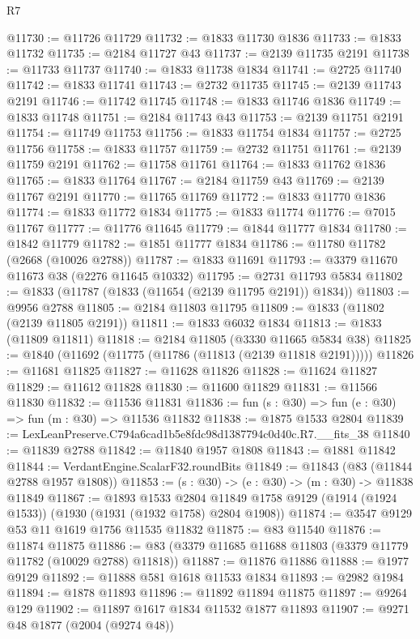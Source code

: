 \begin{lexlean}{R7}
\begin{coremodule}
@11730 := @11726 @11729
@11732 := @1833 @11730 @1836
@11733 := @1833 @11732
@11735 := @2184 @11727 @43
@11737 := @2139 @11735 @2191
@11738 := @11733 @11737
@11740 := @1833 @11738 @1834
@11741 := @2725 @11740
@11742 := @1833 @11741
@11743 := @2732 @11735
@11745 := @2139 @11743 @2191
@11746 := @11742 @11745
@11748 := @1833 @11746 @1836
@11749 := @1833 @11748
@11751 := @2184 @11743 @43
@11753 := @2139 @11751 @2191
@11754 := @11749 @11753
@11756 := @1833 @11754 @1834
@11757 := @2725 @11756
@11758 := @1833 @11757
@11759 := @2732 @11751
@11761 := @2139 @11759 @2191
@11762 := @11758 @11761
@11764 := @1833 @11762 @1836
@11765 := @1833 @11764
@11767 := @2184 @11759 @43
@11769 := @2139 @11767 @2191
@11770 := @11765 @11769
@11772 := @1833 @11770 @1836
@11774 := @1833 @11772 @1834
@11775 := @1833 @11774
@11776 := @7015 @11767
@11777 := @11776 @11645
@11779 := @1844 @11777 @1834
@11780 := @1842 @11779
@11782 := @1851 @11777 @1834
@11786 := @11780 @11782 (@2668 (@10026 @2788))
@11787 := @1833 @11691
@11793 := @3379 @11670 @11673 @38 (@2276 @11645 @10332)
@11795 := @2731 @11793 @5834
@11802 := @1833 (@11787 (@1833 (@11654 (@2139 @11795 @2191)) @1834))
@11803 := @9956 @2788
@11805 := @2184 @11803 @11795
@11809 := @1833 (@11802 (@2139 @11805 @2191))
@11811 := @1833 @6032 @1834
@11813 := @1833 (@11809 @11811)
@11818 := @2184 @11805 (@3330 @11665 @5834 @38)
@11825 := @1840 (@11692 (@11775 (@11786 (@11813 (@2139 @11818 @2191)))))
@11826 := @11681 @11825
@11827 := @11628 @11826
@11828 := @11624 @11827
@11829 := @11612 @11828
@11830 := @11600 @11829
@11831 := @11566 @11830
@11832 := @11536 @11831
@11836 := fun (s : @30) => fun (e : @30) => fun (m : @30) => @11536 @11832
@11838 := @1875 @1533 @2804
@11839 := LexLeanPreserve.C794a6cad1b5e8fdc98d1387794c0d40c.R7.__fits_38
@11840 := @11839 @2788
@11842 := @11840 @1957 @1808
@11843 := @1881 @11842
@11844 := VerdantEngine.ScalarF32.roundBits
@11849 := @11843 (@83 (@11844 @2788 @1957 @1808))
@11853 := (s : @30) -> (e : @30) -> (m : @30) -> @11838 @11849
@11867 := @1893
    @1533
    @2804
    @11849
    @1758
    @9129
    (@1914 (@1924 @1533))
    (@1930 (@1931 (@1932 @1758) @2804 @1908))
@11874 := @3547 @9129 @53 @11 @1619 @1756 @11535 @11832
@11875 := @83 @11540
@11876 := @11874 @11875
@11886 := @83 (@3379 @11685 @11688 @11803 (@3379 @11779 @11782 (@10029 @2788) @11818))
@11887 := @11876 @11886
@11888 := @1977 @9129
@11892 := @11888 @581 @1618 @11533 @1834
@11893 := @2982 @1984
@11894 := @1878 @11893
@11896 := @11892 @11894 @11875
@11897 := @9264 @129
@11902 := @11897 @1617 @1834 @11532 @1877 @11893
@11907 := @9271 @48 @1877 (@2004 (@9274 @48))

\end{coremodule}
\end{lexlean}
